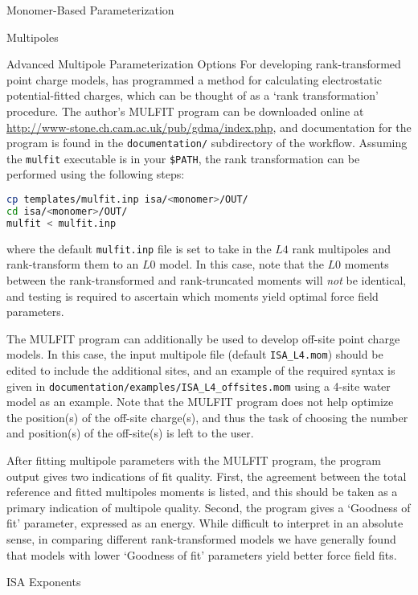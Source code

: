 \begin{section}{Monomer-Based Parameterization}
\begin{subsection}{Multipoles}
\begin{subsubsection}{Advanced Multipole Parameterization Options}
For developing rank-transformed point charge models, \citeauthor{Ferenczy1997} has
programmed a method for calculating electrostatic potential-fitted charges,
which can be thought of as a `rank transformation' procedure. The author's
MULFIT program can be 
downloaded online at
\url{http://www-stone.ch.cam.ac.uk/pub/gdma/index.php}, and documentation for
the program is found in the \verb|documentation/| subdirectory of the
workflow. Assuming the \verb|mulfit| executable is in your \verb|$PATH|, the
rank transformation can be performed using the following steps:
%
\begin{lstlisting}[language=bash]
cp templates/mulfit.inp isa/<monomer>/OUT/
cd isa/<monomer>/OUT/
mulfit < mulfit.inp
\end{lstlisting}
%
where the default \verb|mulfit.inp| file is set to take in the $L4$ rank
multipoles and rank-transform them to an $L0$ model. In this case, note that
the $L0$ moments between the rank-transformed and rank-truncated moments will
\emph{not} be identical, and testing is required to ascertain which
moments yield optimal force field parameters.

The MULFIT program can additionally be used to develop off-site point charge models. In
this case, the input multipole file (default \verb|ISA_L4.mom|) should be
edited to include the additional sites, and an example of the required syntax
is given in \verb|documentation/examples/ISA_L4_offsites.mom| using a
4-site water model as an example. Note that the MULFIT program does not help
optimize the position(s) of the off-site charge(s), and thus the task of choosing
the number and position(s) of the off-site(s) is left to
the user.

After fitting multipole parameters with the MULFIT program, the program output
gives two indications of fit quality. First, the agreement between the total
reference and fitted multipoles moments is listed, and this should be taken as
a primary indication of multipole quality. Second, the program gives a
`Goodness of fit' parameter, expressed as an energy. While difficult to
interpret in an absolute sense, in comparing different rank-transformed models
we have generally found that models with lower `Goodness of fit' parameters
yield better force field fits.

\end{subsubsection}
\end{subsection}

\begin{subsection}{ISA Exponents}
\label{sec:workflow-exponents}


\end{subsection}
\end{section}

